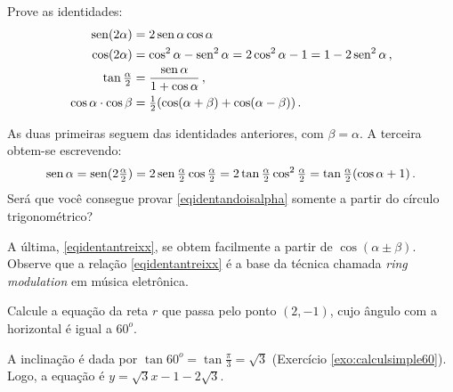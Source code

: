 \begin{exo}
Prove as identidades:
\begin{align}
 \operatorname{sen}(2\alpha)&=2\operatorname{sen}\alpha\cos\alpha\label{eqidensendoisalpha}\\
\cos(2\alpha)&=\cos^2\alpha-\operatorname{sen}^2\alpha=2\cos^2\alpha-1
=1-2\operatorname{sen}^2\alpha\,,\label{eqidencosdoisalpha}\\
\tan\tfrac{\alpha}{2}&=\frac{\operatorname{sen} \alpha}{1+\cos \alpha}\,,\label{eqidentandoisalpha}\\
\cos\alpha\cdot \cos\beta&=\tfrac12(\cos(\alpha+\beta)+\cos(\alpha-\beta))\,.\label{eqidentantreixx}
\end{align}
\begin{sol}
As duas primeiras seguem das identidades anteriores, com $\beta=\alpha$. 
A terceira obtem-se escrevendo:
$$
\operatorname{sen}\alpha=\operatorname{sen}(2\tfrac{\alpha}{2})=2\operatorname{sen}\tfrac{\alpha}{2}\cos\tfrac{\alpha}{2}=
2\tan\tfrac{\alpha}{2}\cos^2\tfrac{\alpha}{2}=\tan\tfrac{\alpha}{2}(\cos\alpha+1)\,.
$$
 Será que você consegue provar \eqref{eqidentandoisalpha} somente a partir do círculo
trigonométrico?

A última, \eqref{eqidentantreixx}, se obtem facilmente a partir de $\cos(\alpha\pm \beta)$. Observe que
a relação \eqref{eqidentantreixx} é a base da técnica chamada \emph{ring modulation} em música
eletrônica.
\end{sol}
\end{exo}


\begin{exo}
 Calcule a equação da reta $r$ que passa pelo ponto $(2,-1)$, cujo ângulo com a horizontal
é igual a $60^o$. 
\begin{sol}
 A inclinação é dada por $\tan 60^o=\tan \frac{\pi}{3}=\sqrt{3}$ (Exercício
\ref{exo:calculsimple60}). Logo, a equação é $y=\sqrt{3}x-1-2\sqrt{3}$.
\end{sol}
\end{exo}

